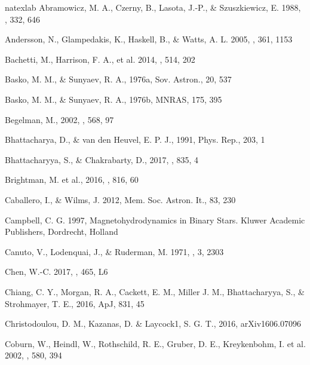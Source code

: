 \documentclass[12pt,preprint]{aastex}
\begin{document}
\begin{thebibliography}{28}

\expandafter\ifx\csname natexlab\endcsname\relax\def\natexlab#1{#1}\fi
{}
Abramowicz, M. A., Czerny, B., Lasota, J.-P., \& Szuszkiewicz, E. 1988, \apj, 332, 646

Andersson, N., Glampedakis, K., Haskell, B., \& Watts, A. L. 2005, \mnras, 361, 1153

Bachetti, M., Harrison, F. A., et al. 2014, \nat, 514, 202

Basko, M. M., \& Sunyaev, R. A., 1976a, Sov. Astron., 20, 537

Basko, M. M., \& Sunyaev, R. A., 1976b, MNRAS, 175, 395

Begelman, M., 2002, \apj, 568, 97

Bhattacharya, D., \& van den Heuvel, E. P. J., 1991, Phys. Rep., 203, 1

Bhattacharyya, S., \& Chakrabarty, D., 2017, \apj, 835, 4

Brightman, M. et al., 2016, \apj, 816, 60

Caballero, I., \& Wilms, J. 2012, Mem. Soc. Astron. It., 83, 230

Campbell, C. G. 1997, Magnetohydrodynamics in Binary Stars. Kluwer Academic Publishers, Dordrecht, Holland

Canuto, V., Lodenquai, J., \& Ruderman, M. 1971, \prd, 3, 2303

Chen, W.-C. 2017, \mnras, 465, L6

Chiang, C. Y., Morgan, R. A., Cackett, E. M., Miller J. M., Bhattacharyya, S., \& Strohmayer, T. E., 2016, ApJ, 831, 45

Christodoulou, D. M., Kazanas, D. \& Laycock1, S. G. T., 2016, arXiv1606.07096

Coburn, W., Heindl, W., Rothschild, R. E., Gruber, D. E., Kreykenbohm, I. et al. 2002, \apj, 580, 394


\end{thebibliography}
\end{document}
